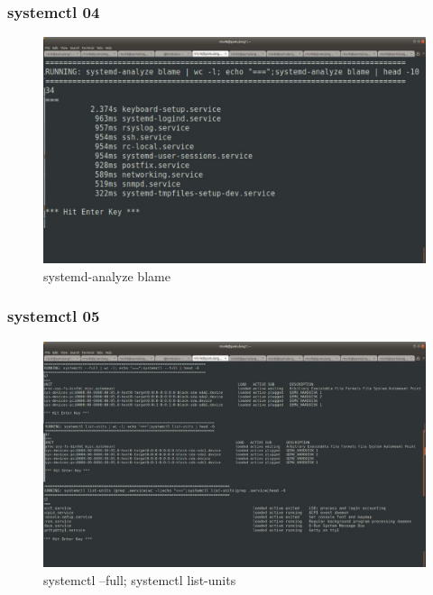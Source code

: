 \documentclass[xcolor=table, notheorems, hyperref={pdfpagelabels=false}]{beamer}
\begin{document}
\begin{frame}[fragile]
\frametitle{systemctl 04}
\begin{figure}
\includegraphics[width=.93\linewidth]{os-systemd03.jpg}
\caption{systemd-analyze blame}
\end{figure}
\end{frame}

\begin{frame}[fragile]
\frametitle{systemctl 05}
\begin{figure}
\includegraphics[width=.93\linewidth]{os-systemd04.jpg}
\caption{systemctl --full; systemctl list-units}
\end{figure}
\end{frame}
\end{document}
